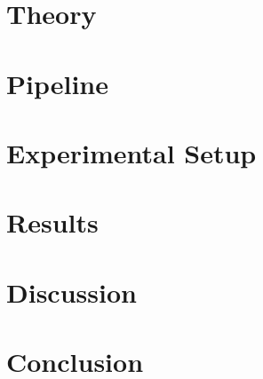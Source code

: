 \documentclass[a4paper]{article}
\begin{document}
\section{Theory}

\section{Pipeline}

\section{Experimental Setup}

\section{Results}

\section{Discussion}

\section{Conclusion}
\end{document}
